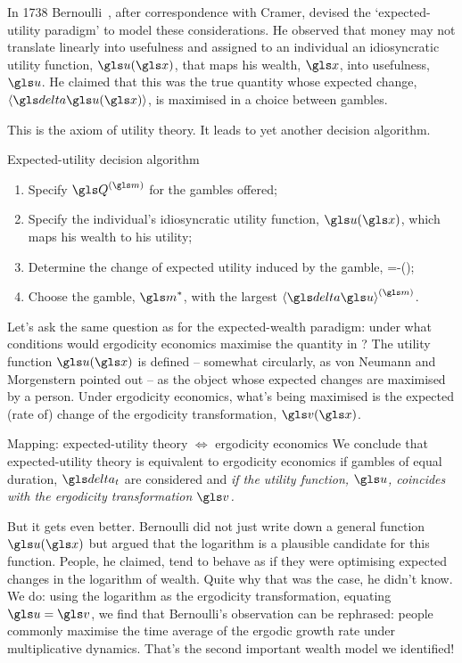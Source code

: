 In 1738 Bernoulli~\cite{Bernoulli1738}, after correspondence with Cramer, devised 
the `expected-utility paradigm' to model these considerations. He observed that 
money may not translate linearly into usefulness and assigned to an individual 
an idiosyncratic utility function, $\gu(\x)$, that maps his wealth, $\x$, 
into usefulness, $\gu$. He claimed that this was the true quantity whose expected change,
 $\ave{\d\gu(\x)}$, is maximised in a choice between gambles.

This is the axiom of utility theory. It leads to yet another decision algorithm.
\begin{keypts}{Expected-utility decision algorithm}
\begin{enumerate}
\item Specify $\Q^{(\m)}$ for the gambles offered;
\item Specify the individual's idiosyncratic utility function, $\gu(\x)$, which maps his wealth to his utility;
\item Determine the change of expected utility induced by the gamble,
\be
\ave{\d\gu}=\ave{\gu\left(\x+\q^{(\m)}\right)}-\gu(\x);
\ee
\item Choose the gamble, $\m^*$, with the largest $\ave{\d\gu}^{(\m)}$.
\end{enumerate}
\end{keypts}

Let's ask the same question as for the expected-wealth paradigm: under what conditions
would ergodicity economics maximise the quantity in ?
The utility function $\gu(\x)$ is defined -- somewhat circularly, as \eg von Neumann and Morgenstern 
pointed out \cite[p.~28]{vonNeumannMorgenstern1944} -- as the object whose expected changes 
are maximised by a person. Under ergodicity economics, what's being maximised is the expected 
(rate of) change of the ergodicity transformation, $\gv(\x)$. 

\begin{keypts}{Mapping: expected-utility theory $\Leftrightarrow$ ergodicity economics}
We conclude that expected-utility theory is 
equivalent to ergodicity economics if gambles of equal duration, $\dt$ are considered
and {\it if the utility function, $\gu$, coincides with the ergodicity transformation $\gv$.}
\end{keypts}

But it gets even better. Bernoulli did not just write down a general function $\gu(\x)$ but argued
that the logarithm is a plausible candidate for this function. People, he claimed, tend to behave
as if they were optimising expected changes in the logarithm of wealth. Quite why that was the case, he didn't know.
We do: using the logarithm as the ergodicity transformation, \ie equating $\gu=\gv$,
we find that Bernoulli's observation can be rephrased: people commonly maximise the time average of the ergodic growth rate under multiplicative dynamics.
That's the second important wealth model we identified!

